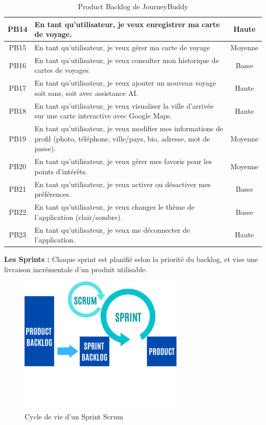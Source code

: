 \begin{table}[H]
    \centering
    \begin{tabularx}{\textwidth}{|c|X|c|}
        \hline
        PB14 & En tant qu’utilisateur, je veux enregistrer ma carte de voyage. & Haute \\
        \hline
        PB15 & En tant qu’utilisateur, je veux gérer ma carte de voyage & Moyenne \\
        \hline
        PB16 & En tant qu’utilisateur, je veux consulter mon historique de cartes de voyages. & Basse \\
        \hline
        PB17 & En tant qu’utilisateur, je veux ajouter un nouveau voyage soit sans, soit avec assistance AI. & Haute \\
        \hline
        PB18 & En tant qu’utilisateur, je veux visualiser la ville d’arrivée sur une carte interactive avec Google Maps. & Haute \\
        \hline
        PB19 & En tant qu’utilisateur, je veux modifier mes informations de profil (photo, téléphone, ville/pays, bio, adresse, mot de passe). & Moyenne \\
        \hline
        PB20 & En tant qu’utilisateur, je veux gérer mes favoris pour les points d’intérêts. & Moyenne \\
        \hline
        PB21 & En tant qu’utilisateur, je veux activer ou désactiver mes préférences. & Basse \\
        \hline
        PB22 & En tant qu’utilisateur, je veux changer le thème de l’application (clair/sombre). & Basse \\
        \hline
        PB23 & En tant qu’utilisateur, je veux me déconnecter de l’application. & Haute \\
        \hline
    \end{tabularx}
    \caption{Product Backlog de JourneyBuddy}
\end{table}

\textbf{Les Sprints :}
Chaque sprint est planifié selon la priorité du backlog, et vise une livraison incrémentale d’un produit utilisable.

\begin{figure}[H]
    \centering
    \includegraphics[width=0.7\textwidth]{figures/scrum-sprint.png} %
    \caption{Cycle de vie d’un Sprint Scrum}
    \label{fig:sprint-cycle}
\end{figure}

